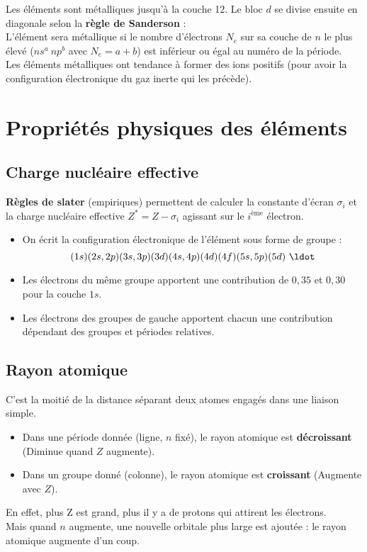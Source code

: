 \documentclass[13pt, twoside, a4paper, french, tikz]{report}
\begin{document}
    Les éléments sont métalliques jusqu'à la couche 12.
    Le bloc $d$ se divise ensuite en diagonale selon la \textbf{règle de Sanderson} :\\
    L'élément sera métallique si le nombre d'électrons $N_e$ sur sa couche de $n$ le plus élevé ($ns^a\ np^b$ avec $N_e = a + b$) est inférieur ou égal au numéro de la période.\\
    Les éléments métalliques ont tendance à former des ions positifs (pour avoir la configuration électronique du gaz inerte qui les précède).


    \chapter{Propriétés physiques des éléments}\label{ch:propriete-physique-des-elements}


    \section{Charge nucléaire effective}\label{sec:charge-nucleaire-effective}

    \textbf{Règles de slater} (empiriques) permettent de calculer la constante d'écran $\sigma_i$ et la charge nucléaire effective $Z^* = Z - \sigma_i$ agissant sur le $i^{\text{ème}}$ électron.\\

    \begin{itemize}
        \item On écrit la configuration électronique de l'élément sous forme de groupe : \[(1s)(2s, 2p)(3s, 3p)(3d)(4s, 4p)(4d)(4f)(5s, 5p)(5d)\ \ldot\]
        \item Les électrons du même groupe apportent une contribution de $0,35$ et $0,30$ pour la couche $1s$.
        \item Les électrons des groupes de gauche apportent chacun une contribution dépendant des groupes et périodes relatives.
    \end{itemize}


    \section{Rayon atomique}\label{sec:rayon-atomique}

    C'est la moitié de la distance séparant deux atomes engagés dans une liaison simple.
    \begin{itemize}
        \item Dans une période donnée (ligne, $n$ fixé), le rayon atomique est \textbf{décroissant} (Diminue quand $Z$ augmente).
        \item Dans un groupe donné (colonne), le rayon atomique est \textbf{croissant} (Augmente avec $Z$).
    \end{itemize}
    \vspace{7pt}
    En effet, plus Z est grand, plus il y a de protons qui attirent les électrons.\\
    Mais quand $n$ augmente, une nouvelle orbitale plus large est ajoutée : le rayon atomique augmente d'un coup.
\end{document}
